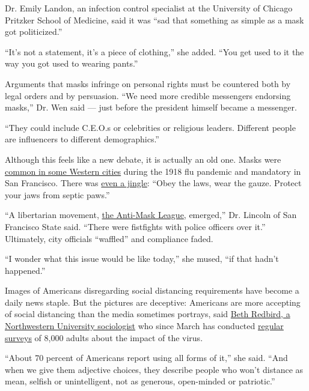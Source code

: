 Dr. Emily Landon, an infection control specialist at the University of
Chicago Pritzker School of Medicine, said it was ``sad that something as
simple as a mask got politicized.''

``It's not a statement, it's a piece of clothing,'' she added. ``You get
used to it the way you got used to wearing pants.''

Arguments that masks infringe on personal rights must be countered both
by legal orders and by persuasion. ``We need more credible messengers
endorsing masks,'' Dr. Wen said --- just before the president himself
became a messenger.

``They could include C.E.O.s or celebrities or religious leaders.
Different people are influencers to different demographics.''

Although this feels like a new debate, it is actually an old one. Masks
were
\href{https://www.history.com/news/1918-spanish-flu-mask-wearing-resistance}{common
in some Western cities} during the 1918 flu pandemic and mandatory in
San Francisco. There was
\href{https://www.pbs.org/wgbh/americanexperience/features/influenza-san-francisco/\#:~:text=One\%20of\%20the\%20more\%20highly,the\%20spread\%20of\%20flu\%20germs.\&text=A\%20Mask\%20is\%2099\%25\%20Proof,laws\%2C\%20and\%20wear\%20the\%20gauze.}{even
a jingle}: ``Obey the laws, wear the gauze. Protect your jaws from
septic paws.''

``A libertarian movement,
\href{https://www.nytimes3xbfgragh.onion/2020/08/03/us/mask-protests-1918.html}{the
Anti-Mask League}, emerged,'' Dr. Lincoln of San Francisco State said.
``There were fistfights with police officers over it.'' Ultimately, city
officials ``waffled'' and compliance faded.

``I wonder what this issue would be like today,'' she mused, ``if that
hadn't happened.''

Images of Americans disregarding social distancing requirements have
become a daily news staple. But the pictures are deceptive: Americans
are more accepting of social distancing than the media sometimes
portrays, said
\href{https://magazine.northwestern.edu/exclusives/covid-19-impact-research/}{Beth
Redbird, a Northwestern University sociologist} who since March has
conducted \href{https://coronadata.us/data/}{regular surveys} of 8,000
adults about the impact of the virus.

``About 70 percent of Americans report using all forms of it,'' she
said. ``And when we give them adjective choices, they describe people
who won't distance as mean, selfish or unintelligent, not as generous,
open-minded or patriotic.''

